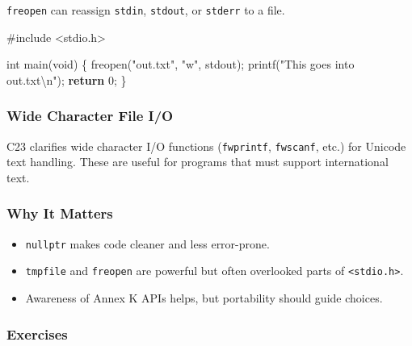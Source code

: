\documentclass[
  letterpaper,
  DIV=11,
  numbers=noendperiod]{scrreprt}
\newenvironment{Shaded}{\begin{snugshade}}{\end{snugshade}}
\newcommand{\ControlFlowTok}[1]{\textcolor[rgb]{0.00,0.23,0.31}{\textbf{#1}}}
\newcommand{\DataTypeTok}[1]{\textcolor[rgb]{0.68,0.00,0.00}{#1}}
\newcommand{\DecValTok}[1]{\textcolor[rgb]{0.68,0.00,0.00}{#1}}
\newcommand{\ImportTok}[1]{\textcolor[rgb]{0.00,0.46,0.62}{#1}}
\newcommand{\NormalTok}[1]{\textcolor[rgb]{0.00,0.23,0.31}{#1}}
\newcommand{\OperatorTok}[1]{\textcolor[rgb]{0.37,0.37,0.37}{#1}}
\newcommand{\PreprocessorTok}[1]{\textcolor[rgb]{0.68,0.00,0.00}{#1}}
\newcommand{\SpecialCharTok}[1]{\textcolor[rgb]{0.37,0.37,0.37}{#1}}
\newcommand{\StringTok}[1]{\textcolor[rgb]{0.13,0.47,0.30}{#1}}
\providecommand{\tightlist}{%
  \setlength{\itemsep}{0pt}\setlength{\parskip}{0pt}}
\begin{document}
\texttt{freopen} can reassign \texttt{stdin}, \texttt{stdout}, or
\texttt{stderr} to a file.

\begin{Shaded}
\begin{Highlighting}[]
\PreprocessorTok{\#include }\ImportTok{\textless{}stdio.h\textgreater{}}

\DataTypeTok{int}\NormalTok{ main}\OperatorTok{(}\DataTypeTok{void}\OperatorTok{)} \OperatorTok{\{}
\NormalTok{    freopen}\OperatorTok{(}\StringTok{"out.txt"}\OperatorTok{,} \StringTok{"w"}\OperatorTok{,}\NormalTok{ stdout}\OperatorTok{);}
\NormalTok{    printf}\OperatorTok{(}\StringTok{"This goes into out.txt}\SpecialCharTok{\textbackslash{}n}\StringTok{"}\OperatorTok{);}
    \ControlFlowTok{return} \DecValTok{0}\OperatorTok{;}
\OperatorTok{\}}
\end{Highlighting}
\end{Shaded}

\subsubsection{Wide Character File I/O}\label{wide-character-file-io}

C23 clarifies wide character I/O functions (\texttt{fwprintf},
\texttt{fwscanf}, etc.) for Unicode text handling. These are useful for
programs that must support international text.

\subsubsection{Why It Matters}\label{why-it-matters-47}

\begin{itemize}
\tightlist
\item
  \texttt{nullptr} makes code cleaner and less error-prone.
\item
  \texttt{tmpfile} and \texttt{freopen} are powerful but often
  overlooked parts of \texttt{\textless{}stdio.h\textgreater{}}.
\item
  Awareness of Annex K APIs helps, but portability should guide choices.
\end{itemize}

\subsubsection{Exercises}\label{exercises-49}
\end{document}
